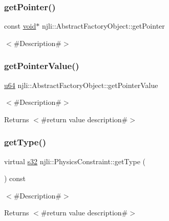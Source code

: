 \subsubsection{\texorpdfstring{get\+Pointer()}{getPointer()}}
{\footnotesize\ttfamily const \mbox{\hyperlink{_thread_8h_af1e856da2e658414cb2456cb6f7ebc66}{void}}$\ast$ njli\+::\+Abstract\+Factory\+Object\+::get\+Pointer}

$<$\#\+Description\#$>$ \mbox{\label{classnjli_1_1_physics_constraint_a4ffddf141a426a5a07d0ac19f1913811}} 
\subsubsection{\texorpdfstring{get\+Pointer\+Value()}{getPointerValue()}}
{\footnotesize\ttfamily \mbox{\hyperlink{_util_8h_ad758b7a5c3f18ed79d2fcd23d9f16357}{u64}} njli\+::\+Abstract\+Factory\+Object\+::get\+Pointer\+Value}

$<$\#\+Description\#$>$

\begin{DoxyReturn}{Returns}
$<$\#return value description\#$>$ 
\end{DoxyReturn}
\mbox{\label{classnjli_1_1_physics_constraint_a3234aefaf2706165fbc52b5b37c05888}} 
\subsubsection{\texorpdfstring{get\+Type()}{getType()}}
{\footnotesize\ttfamily virtual \mbox{\hyperlink{_util_8h_aa62c75d314a0d1f37f79c4b73b2292e2}{s32}} njli\+::\+Physics\+Constraint\+::get\+Type (\begin{DoxyParamCaption}{ }\end{DoxyParamCaption}) const\hspace{0.3cm}{\ttfamily [virtual]}}

$<$\#\+Description\#$>$

\begin{DoxyReturn}{Returns}
$<$\#return value description\#$>$ 
\end{DoxyReturn}


